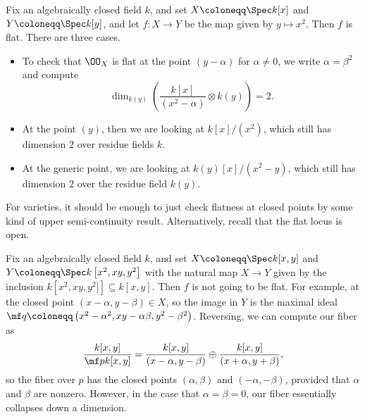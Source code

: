 \documentclass[../notes.tex]{subfiles}
\begin{document}
\begin{example}
	Fix an algebraically closed field $k$, and set $X\coloneqq\Spec k[x]$ and $Y\coloneqq\Spec k[y]$, and let $f\colon X\to Y$ be the map given by $y\mapsto x^2$. Then $f$ is flat. There are three cases.
	\begin{itemize}
		\item To check that $\OO_X$ is flat at the point $(y-\alpha)$ for $\alpha\ne0$, we write $\alpha=\beta^2$ and compute
		\[\dim_{k(y)}\left(\frac{k[x]}{\left(x^2-\alpha\right)}\otimes k(y)\right)=2.\]
		\item At the point $(y)$, then we are looking at $k[x]/\left(x^2\right)$, which still has dimension $2$ over residue fields $k$.
		\item At the generic point, we are looking at $k(y)[x]/\left(x^2-y\right)$, which still has dimension $2$ over the residue field $k(y)$.
	\end{itemize}
\end{example}
\begin{remark}
	For varieties, it should be enough to just check flatness at closed points by some kind of upper semi-continuity result. Alternatively, recall that the flat locus is open.
\end{remark}
\begin{example}
	Fix an algebraically closed field $k$, and set $X\coloneqq\Spec k[x,y]$ and $Y\coloneqq\Spec k\left[x^2,xy,y^2\right]$ with the natural map $X\to Y$ given by the inclusion $k\left[x^2,xy,y^2]\right]\subseteq k[x,y]$. Then $f$ is not going to be flat. For example, at the closed point $\left(x-\alpha,y-\beta\right)\in X$, so the image in $Y$ is the maximal ideal $\mf q\coloneqq\left(x^2-\alpha^2,xy-\alpha\beta,y^2-\beta^2\right)$. Reversing, we can compute our fiber as
	\[\frac{k[x,y]}{\mf pk[x,y]}=\frac{k[x,y]}{(x-\alpha,y-\beta)}\oplus\frac{k[x,y]}{(x+\alpha,y+\beta)},\]
	so the fiber over $p$ has the closed points $(\alpha,\beta)$ and $(-\alpha,-\beta)$, provided that $\alpha$ and $\beta$ are nonzero. However, in the case that $\alpha=\beta=0$, our fiber essentially collapses down a dimension.
\end{example}
\end{document}
